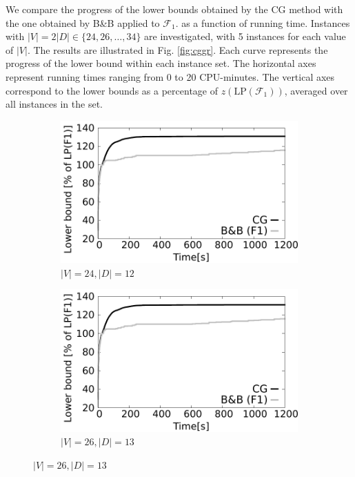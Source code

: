 We compare the progress of the lower bounds obtained by the CG method with the one obtained by B\&B applied to $\mathcal{F}_1$.
 as a function of running time.
Instances with $|V|=2|D|\in\{24, 26,\ldots, 34\}$ are investigated, with 5 instances for each value of $|V|$.
The results are illustrated in Fig. \ref{fig:cggr}.
Each curve represents the progress of the lower bound within each instance set.
The horizontal axes represent running times ranging from 0 to 20 CPU-minutes.
The vertical axes correspond to the lower bounds as a percentage of $z\left(\text{LP}(\mathcal{F}_1)\right)$, averaged over all instances in the set.
 
\begin{figure}[!htb]
    \centering
    \begin{subfigure}[b]{0.49\textwidth}
        \includegraphics[width=\textwidth]{lower-bound-24-12}
        \caption{$|V|=24, |D|=12$}
        \label{fig:cggr24-12}
    \end{subfigure}
    \hfill %
    \begin{subfigure}[b]{0.49\textwidth}
        \includegraphics[width=\textwidth]{lower-bound-26-13}
        \caption{$|V|=26, |D|=13$}
        \label{fig:cggr26-13}
    \end{subfigure}
  

\end{figure}

